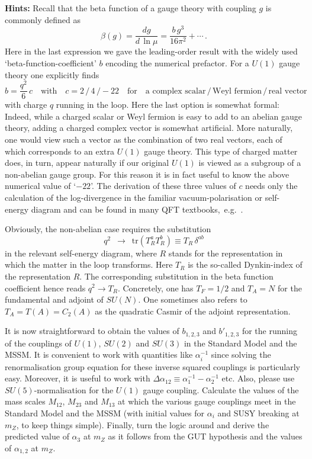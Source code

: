 \documentclass[12pt]{article}
\newcommand{\be}{\begin{equation}}
\newcommand{\ee}{\end{equation}}
\numberwithin{equation}{section}
\begin{document}
\noindent
{\bf Hints:} Recall that the beta function of a gauge theory with coupling $g$ is commonly defined as
\be
\beta(g)=\frac{dg}{d\,\ln\mu}=\frac{b\,g^3}{16\pi^2}+\cdots\,.
\ee
Here in the last expression we gave the leading-order result with the widely used `beta-function-coefficient' $b$ encoding the numerical prefactor. For a $U(1)$ gauge theory one explicitly finds
\be
b=\frac{q^2}{6}\,c\quad\mbox{with}\quad c=2\,/\,4\,/-22\quad\mbox{for}
\quad\mbox{a complex scalar$\,$/$\,$Weyl fermion$\,$/$\,$real vector}
\ee
with charge $q$ running in the loop. Here the last option is somewhat formal: Indeed, while a charged scalar or Weyl fermion is easy to add to an abelian gauge theory, adding a charged complex vector is somewhat artificial. More naturally, one would view such a vector as the combination of two real vectors, each of which corresponds to an extra $U(1)$ gauge theory. This type of charged matter does, in turn, appear naturally if our original $U(1)$ is viewed as a subgroup of a non-abelian gauge group. For this reason it is in fact useful to know the above numerical value of `$-22$'. The derivation of these three values of $c$ needs only the calculation of the log-divergence in the familiar vacuum-polarisation or self-energy diagram and can be found in many QFT textbooks,~e.g.~\cite{Peskin:1995ev}.

Obviously, the non-abelian case requires the substitution
\be
q^2\,\,\,\to\,\,\,\mbox{tr}(T_R^a T_R^b)\equiv T_R\,\delta^{ab}
\ee
in the relevant self-energy diagram, where $R$ stands for the representation in which the matter in the loop transforms. Here $T_R$ is the so-called Dynkin-index of the representation $R$. The corresponding substitution in the beta function coefficient hence reads $q^2\to T_R$. Concretely, one has $T_F=1/2$ and $T_A=N$ for the fundamental and adjoint of $SU(N)$. One sometimes also refers to $T_A=T(A)=C_2(A)$ as the quadratic Casmir of the adjoint representation. 

It is now straightforward to obtain the values of $b_{1,2,3}$ and $b'_{1,2,3}$ for the running of the couplings of $U(1)$, $SU(2)$ and $SU(3)$ in the Standard Model and the MSSM. It is convenient to work with quantities like $\alpha_i^{-1}$ since solving the renormalisation group equation for these inverse squared couplings is particularly easy. Moreover, it is useful to work with $\Delta\alpha_{12}\equiv \alpha_1^{-1}-\alpha_2^{-1}$ etc. Also, please use $SU(5)$-normalisation for the $U(1)$ gauge coupling. Calculate the values of the mass scales $M_{12}$, $M_{23}$ and $M_{13}$ at which the various gauge couplings meet in the Standard Model and the MSSM (with initial values for $\alpha_i$ and SUSY breaking at $m_Z$, to keep things simple). Finally, turn the logic around and derive the predicted value of $\alpha_3$ at $m_Z$ as it follows from the GUT hypothesis and the values of $\alpha_{1,2}$ at $m_Z$. 
\end{document}
